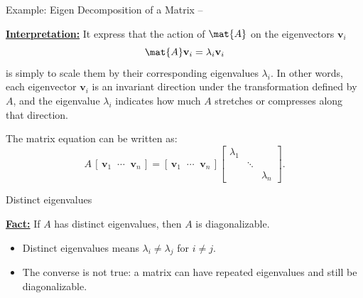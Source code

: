 \begin{frame}{Example: Eigen Decomposition of a Matrix --}
    \pagebreak

    \begin{alertblock}{\textbf{\underline{Interpretation:}}}\medskip
        It express that the action of $\mat{A}$ on the eigenvectors $\mathbf{v}_i$
        \[\mat{A}\mathbf{v}_i = \lambda_i\mathbf{v}_i\]
        is simply to scale them by their corresponding eigenvalues $\lambda_i$. In other words, each eigenvector $\mathbf{v}_i$ is an invariant direction under the transformation defined by $A$, and the eigenvalue $\lambda_i$ indicates how much $A$ stretches or compresses along that direction.

        \medskip
        The matrix equation can be written as:
        \[
            A\,\left[\, \mathbf{v}_1 \;\; \cdots \;\; \mathbf{v}_n \,\right]
            =
            \left[\, \mathbf{v}_1 \;\; \cdots \;\; \mathbf{v}_n \,\right]
            \begin{bmatrix}
                \lambda_1             \\
                 & \ddots             \\
                 &        & \lambda_n
            \end{bmatrix}.
        \]
    \end{alertblock}

\end{frame}

\begin{frame}[t, fragile]{Distinct eigenvalues}

    \begin{alertblock}{\textbf{\underline{Fact:}}}\medskip
        If $A$ has distinct eigenvalues, then $A$ is diagonalizable.
    \end{alertblock}

    \begin{itemize}
        \item \alert{Distinct eigenvalues} means $\lambda_i \neq \lambda_j$ for $i \neq j$.

        \item The converse is \alert{not} true:
              a matrix can have repeated eigenvalues and still be diagonalizable.
    \end{itemize}

\end{frame}


